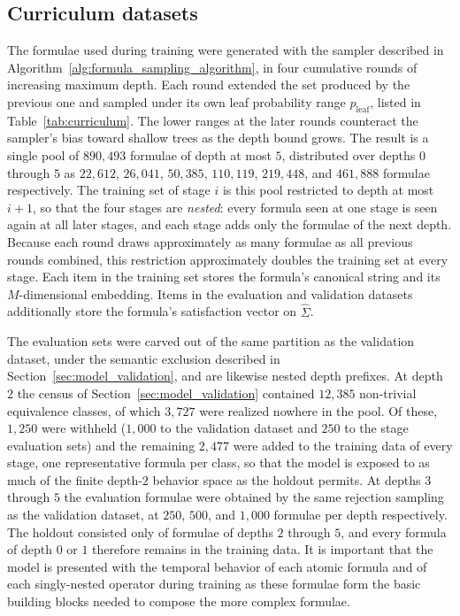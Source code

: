 \documentclass[titlepage,a4paper,11pt]{report}
\begin{document}
    \subsection{Curriculum datasets}\label{sec:curriculum_data}
    The formulae used during training were generated with the sampler described in Algorithm~\ref{alg:formula_sampling_algorithm}, in four cumulative rounds of increasing maximum depth. Each round extended the set produced by the previous one and sampled under its own leaf probability range $p_{\text{leaf}}$, listed in Table~\ref{tab:curriculum}. The lower ranges at the later rounds counteract the sampler's bias toward shallow trees as the depth bound grows. The result is a single pool of $890{,}493$ formulae of depth at most $5$, distributed over depths $0$ through $5$ as $22{,}612$, $26{,}041$, $50{,}385$, $110{,}119$, $219{,}448$, and $461{,}888$ formulae respectively. The training set of stage $i$ is this pool restricted to depth at most $i+1$, so that the four stages are \emph{nested}: every formula seen at one stage is seen again at all later stages, and each stage adds only the formulae of the next depth. Because each round draws approximately as many formulae as all previous rounds combined, this restriction approximately doubles the training set at every stage. Each item in the training set stores the formula's canonical string and its $M$-dimensional embedding. Items in the evaluation and validation datasets additionally store the formula's satisfaction vector on $\widehat\Sigma$.
    
    The evaluation sets were carved out of the same partition as the validation dataset, under the semantic exclusion described in Section~\ref{sec:model_validation}, and are likewise nested depth prefixes. At depth $2$ the census of Section~\ref{sec:model_validation} contained $12{,}385$ non-trivial equivalence classes, of which $3{,}727$ were realized nowhere in the pool. Of these, $1{,}250$ were withheld ($1{,}000$ to the validation dataset and $250$ to the stage evaluation sets) and the remaining $2{,}477$ were added to the training data of every stage, one representative formula per class, so that the model is exposed to as much of the finite depth-$2$ behavior space as the holdout permits. At depths $3$ through $5$ the evaluation formulae were obtained by the same rejection sampling as the validation dataset, at $250$, $500$, and $1{,}000$ formulae per depth respectively. The holdout consisted only of formulae of depths $2$ through $5$, and every formula of depth $0$ or $1$ therefore remains in the training data. It is important that the model is presented with the temporal behavior of each atomic formula and of each singly-nested operator during training as these formulae form the basic building blocks needed to compose the more complex formulae.
    
\end{document}
